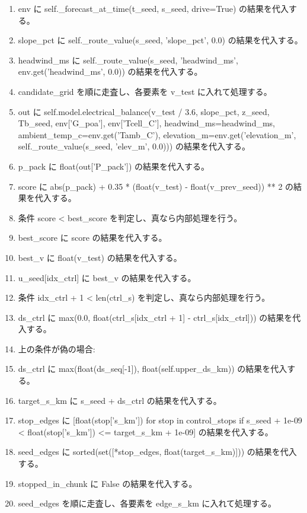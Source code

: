 \documentclass[a4paper,11pt]{article}
\begin{document}
\begin{enumerate}[leftmargin=1.8em]
\item   env に self.\_forecast\_at\_time(t\_seed, s\_seed, drive=True) の結果を代入する。
\item   slope\_pct に self.\_route\_value(s\_seed, 'slope\_pct', 0.0) の結果を代入する。
\item   headwind\_ms に self.\_route\_value(s\_seed, 'headwind\_ms', env.get('headwind\_ms', 0.0)) の結果を代入する。
\item   candidate\_grid を順に走査し、各要素を v\_test に入れて処理する。
\item     out に self.model.electrical\_balance(v\_test / 3.6, slope\_pct, z\_seed, Tb\_seed, env['G\_poa'], env['Tcell\_C'], headwind\_ms=headwind\_ms, ambient\_temp\_c=env.get('Tamb\_C'), elevation\_m=env.get('elevation\_m', self.\_route\_value(s\_seed, 'elev\_m', 0.0))) の結果を代入する。
\item     p\_pack に float(out['P\_pack']) の結果を代入する。
\item     score に abs(p\_pack) + 0.35 * (float(v\_test) - float(v\_prev\_seed)) ** 2 の結果を代入する。
\item     条件 score < best\_score を判定し、真なら内部処理を行う。
\item       best\_score に score の結果を代入する。
\item       best\_v に float(v\_test) の結果を代入する。
\item   u\_seed[idx\_ctrl] に best\_v の結果を代入する。
\item   条件 idx\_ctrl + 1 < len(ctrl\_s) を判定し、真なら内部処理を行う。
\item     ds\_ctrl に max(0.0, float(ctrl\_s[idx\_ctrl + 1] - ctrl\_s[idx\_ctrl])) の結果を代入する。
\item     上の条件が偽の場合:
\item     ds\_ctrl に max(float(ds\_seq[-1]), float(self.upper\_ds\_km)) の結果を代入する。
\item   target\_s\_km に s\_seed + ds\_ctrl の結果を代入する。
\item   stop\_edges に [float(stop['s\_km']) for stop in control\_stops if s\_seed + 1e-09 < float(stop['s\_km']) <= target\_s\_km + 1e-09] の結果を代入する。
\item   seed\_edges に sorted(set([*stop\_edges, float(target\_s\_km)])) の結果を代入する。
\item   stopped\_in\_chunk に False の結果を代入する。
\item   seed\_edges を順に走査し、各要素を edge\_s\_km に入れて処理する。

\end{enumerate}
\end{document}

